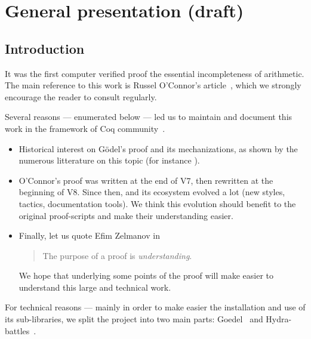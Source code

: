 \chapter{General presentation (draft)}

\section{Introduction}


It was the first computer verified proof 
the essential incompleteness of arithmetic.
The main reference to this work is  Russel O'Connor's article~\cite{OConnor05}, which we strongly encourage the reader to 
consult regularly. 

Several reasons --- enumerated below --- led us to maintain and document this work in the framework of 
Coq community~\cite{CoqCommunity}.



 \begin{itemize}
 \item Historical interest on G\"{o}del's proof and its mechanizations, as shown by the numerous litterature on this topic
   (for instance \cite{smullyan1992godel, Hofstadter1999Godel, GoedelCassou}).
 
   
  \item O'Connor's proof was written at the end of \coq V7, then rewritten at the beginning of \coq V8. Since then, \coq and its ecosystem evolved a lot (new styles, tactics, documentation tools).
          We think this evolution should benefit
          to the original proof-scripts and make their understanding easier.

        \item Finally, let us quote  Efim Zelmanov in~\cite{mathproof}
             \begin{quote}
      The purpose of a proof is \emph{understanding}.
       
    \end{quote}
    We hope that underlying some points of the proof will
     make easier to understand this large and technical work.

        \end{itemize}

     
        For technical reasons --- mainly in order to make easier the installation and use of its sub-libraries, we split the project
into two main parts: Goedel~\cite{Goedel} and Hydra-battles~\cite{HydraBattles}.



